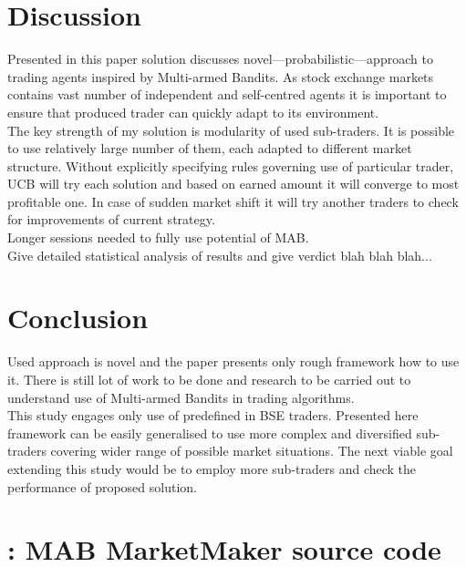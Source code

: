 \documentclass{llncs}
\begin{document}
\section{Discussion}
Presented in this paper solution discusses novel---probabilistic---approach to trading agents inspired by Multi-armed Bandits. As stock exchange markets contains vast number of independent and self-centred agents it is important to ensure that produced trader can quickly adapt to its environment.\\
The key strength of my solution is modularity of used sub-traders. It is possible to use relatively large number of them, each adapted to different market structure. Without explicitly specifying rules governing use of particular trader, UCB will try each solution and based on earned amount it will converge to most profitable one. In case of sudden market shift it will try another traders to check for improvements of current strategy.\\

Longer sessions needed to fully use potential of MAB.\\
Give detailed statistical analysis of results and give verdict blah blah blah...\\

\section{Conclusion}
Used approach is novel and the paper presents only rough framework how to use it. There is still lot of work to be done and research to be carried out to understand use of Multi-armed Bandits in trading algorithms.\\

This study engages only use of predefined in BSE traders. Presented here framework can be easily generalised to use more complex and diversified sub-traders covering wider range of possible market situations. The next viable goal extending this study would be to employ more sub-traders and check the performance of proposed solution.


\vfill



\newpage
\section*{\appendixname: MAB MarketMaker source code\label{app:MABmm}}

\end{document}
